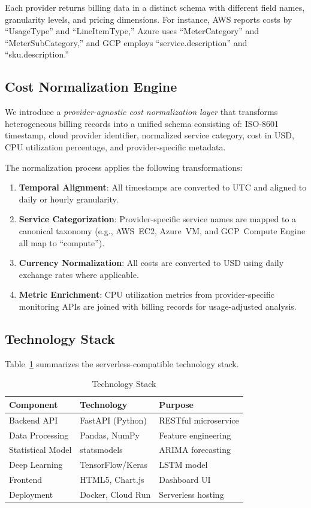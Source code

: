 \documentclass[conference]{IEEEtran}
\begin{document}
Each provider returns billing data in a distinct schema with different field names, granularity levels, and pricing dimensions. For instance, AWS reports costs by ``UsageType'' and ``LineItemType,'' Azure uses ``MeterCategory'' and ``MeterSubCategory,'' and GCP employs ``service.description'' and ``sku.description.''

\subsection{Cost Normalization Engine}

We introduce a \emph{provider-agnostic cost normalization layer} that transforms heterogeneous billing records into a unified schema consisting of: ISO-8601 timestamp, cloud provider identifier, normalized service category, cost in USD, CPU utilization percentage, and provider-specific metadata.

The normalization process applies the following transformations:
\begin{enumerate}
    \item \textbf{Temporal Alignment}: All timestamps are converted to UTC and aligned to daily or hourly granularity.
    \item \textbf{Service Categorization}: Provider-specific service names are mapped to a canonical taxonomy (e.g., AWS~EC2, Azure~VM, and GCP~Compute Engine all map to ``compute'').
    \item \textbf{Currency Normalization}: All costs are converted to USD using daily exchange rates where applicable.
    \item \textbf{Metric Enrichment}: CPU utilization metrics from provider-specific monitoring APIs are joined with billing records for usage-adjusted analysis.
\end{enumerate}

\subsection{Technology Stack}

Table~\ref{tab:techstack} summarizes the serverless-compatible technology stack.

\begin{table}[htbp]
\caption{Technology Stack}
\label{tab:techstack}
\centering
\begin{tabular}{@{}lll@{}}
\toprule
\textbf{Component} & \textbf{Technology} & \textbf{Purpose} \\
\midrule
Backend API & FastAPI (Python) & RESTful microservice \\
Data Processing & Pandas, NumPy & Feature engineering \\
Statistical Model & statsmodels & ARIMA forecasting \\
Deep Learning & TensorFlow/Keras & LSTM model \\
Frontend & HTML5, Chart.js & Dashboard UI \\
Deployment & Docker, Cloud Run & Serverless hosting \\
\bottomrule
\end{tabular}
\end{table}
\end{document}
